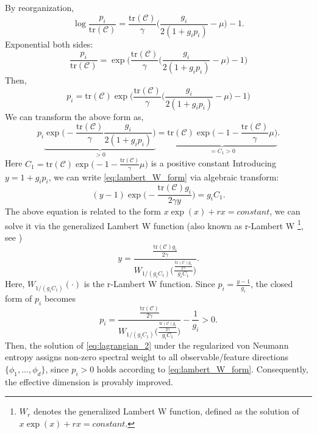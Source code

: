 \documentclass{article} %
\begin{document}
\begin{proofwithframe}
By reorganization,  
\[
\log \frac{p_i}{\mathrm{tr}(\mathcal{C})} = \frac{\mathrm{tr}(\mathcal{C})}{\gamma} \bigg(\frac{g_i}{ 2(1+g_ip_i)} - \mu \bigg) -1. 
\]
Exponential both sides:
\[
\frac{p_i}{\mathrm{tr}(\mathcal{C})} = \exp \bigg( \frac{\mathrm{tr}(\mathcal{C})}{\gamma} \bigg( \frac{g_i}{ 2(1+g_ip_i)} - \mu \bigg) -1  \bigg)
\]
Then,
\[
p_i = \mathrm{tr}(\mathcal{C}) \exp \bigg( \frac{\mathrm{tr}(\mathcal{C})}{\gamma} \bigg(\frac{g_i}{ 2(1+g_ip_i)} - \mu \bigg) -1  \bigg)
\]
We can transform the above form as,  
\begin{equation} \label{eq:lambert_W_form}
    p_i  \underbrace{\exp \bigg( - \frac{\mathrm{tr}(\mathcal{C})}{\gamma} \frac{g_i}{ 2(1+g_ip_i)} \bigg)}_{> 0} = \underbrace{\mathrm{tr}(\mathcal{C}) \exp \bigg(-1 -  \frac{\mathrm{tr}(\mathcal{C})}{\gamma} \mu \bigg)}_{= C_1 > 0}.
\end{equation}
Here $C_1 = \mathrm{tr}(\mathcal{C}) \exp \bigg(-1 -  \frac{\mathrm{tr}(\mathcal{C})}{\gamma} \mu \bigg)$ is a positive constant Introducing $y = 1 + g_ip_i$, we can write \eqref{eq:lambert_W_form} via algebraic transform: 
\begin{equation} 
    (y - 1) \exp \bigg( - \frac{\mathrm{tr}(\mathcal{C})g_i}{2 \gamma y }\bigg) = g_i C_1.
\end{equation}
The above equation is related to the form $x\exp(x) + rx = constant$, we can solve it via the generalized Lambert W function (also known as r-Lambert W \footnote{$W_r$ denotes the generalized Lambert W function, defined as the solution of $x\exp(x) + rx = constant$.}, see \citep{veberivc2012lambert})  
\begin{equation}
    y = \frac{\frac{\mathrm{tr}(\mathcal{C})g_i}{2\gamma}}{W_{1/(g_iC_1)}\big( \frac{\frac{\mathrm{tr}(\mathcal{C})g_i}{2\gamma}}{g_iC_1}\big)}.
\end{equation}
Here, $W_{1/(g_iC_1)}(\cdot)$ is the r-Lambert W function. Since $p_i = \frac{y-1}{g_i}$, the closed form of $p_i$ becomes
\begin{equation}
    p_i = \frac{\frac{\mathrm{tr}(\mathcal{C})}{2\gamma}}{W_{1/(g_iC_1)}\big( \frac{\frac{\mathrm{tr}(\mathcal{C})g_i}{2\gamma}}{g_iC_1}\big)} - \frac{1}{g_i} > 0. 
\end{equation}
Then, the solution of \eqref{eq:lagrangian_2} under the regularized von Neumann entropy assigns non-zero spectral weight to all observable/feature directions $\{\phi_1,\dots,\phi_d \}$, since $p_i>0$ holds according to \eqref{eq:lambert_W_form}. Consequently, the effective dimension is provably improved.

\end{proofwithframe}
\end{document}
